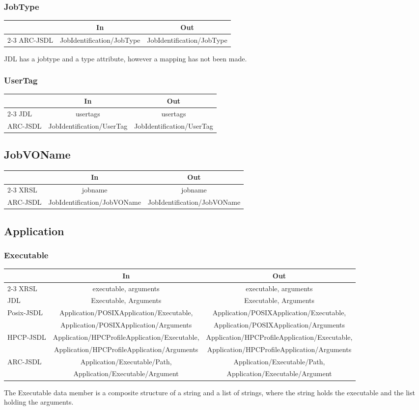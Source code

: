 \documentclass{article}
\newenvironment{inouttabular}%
{\begin{center}\begin{tabular}{l>{\ttfamily\footnotesize}c>{\ttfamily\footnotesize}c}%
\toprule
& \textnormal{\normalsize{In}} & \textnormal{\normalsize{Out}}\\ \cmidrule{2-3}}
{\bottomrule\end{tabular}\end{center}}
\begin{document}
\subsubsection{JobType}
\begin{inouttabular}
ARC-JSDL & JobIdentification/JobType & JobIdentification/JobType\\
\end{inouttabular}
JDL has a jobtype and a type attribute, however a mapping has not been
made.

\subsubsection{UserTag}
\begin{inouttabular}
JDL & usertags & usertags\\
ARC-JSDL & JobIdentification/UserTag & JobIdentification/UserTag\\
\end{inouttabular}

\subsection{JobVOName}
\begin{inouttabular}
XRSL & jobname & jobname\\
ARC-JSDL & JobIdentification/JobVOName & JobIdentification/JobVOName\\
\end{inouttabular}

\subsection{Application}
\subsubsection{Executable}
\begin{inouttabular}
XRSL & executable, arguments & executable, arguments\\
JDL & Executable, Arguments & Executable, Arguments\\
\multirow{2}{*}{Posix-JSDL} & Application/POSIXApplication/Executable, & Application/POSIXApplication/Executable,\\
&  Application/POSIXApplication/Arguments & Application/POSIXApplication/Arguments\\
\multirow{2}{*}{HPCP-JSDL} & Application/HPCProfileApplication/Executable, & Application/HPCProfileApplication/Executable,\\
&  Application/HPCProfileApplication/Arguments & Application/HPCProfileApplication/Arguments\\
\multirow{2}{*}{ARC-JSDL} & Application/Executable/Path, & Application/Executable/Path,\\
 & Application/Executable/Argument & Application/Executable/Argument\\
\end{inouttabular}
The Executable data member is a composite structure of a string and a
list of strings, where the string holds the executable and the list
holding the arguments.
\end{document}
